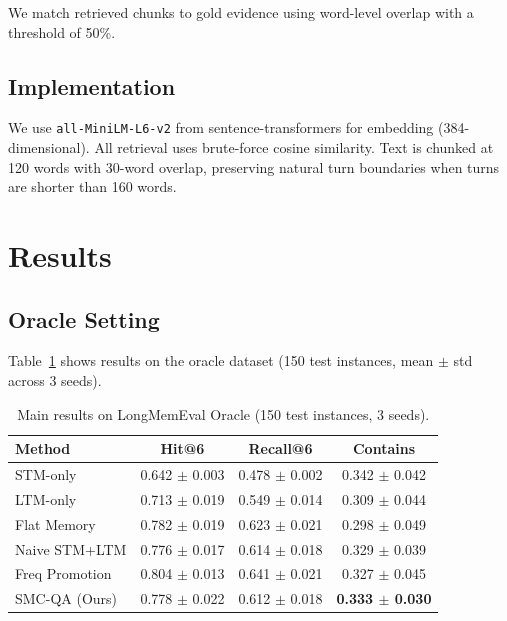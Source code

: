 \documentclass{article}
\begin{document}
We match retrieved chunks to gold evidence using word-level overlap with a threshold of 50\%.

\subsection{Implementation}

We use \texttt{all-MiniLM-L6-v2} from sentence-transformers for embedding (384-dimensional). All retrieval uses brute-force cosine similarity. Text is chunked at 120 words with 30-word overlap, preserving natural turn boundaries when turns are shorter than 160 words.

\section{Results}

\subsection{Oracle Setting}

Table~\ref{tab:main} shows results on the oracle dataset (150 test instances, mean $\pm$ std across 3 seeds).

\begin{table}[h]
\centering
\caption{Main results on LongMemEval Oracle (150 test instances, 3 seeds).}
\label{tab:main}
\begin{tabular}{lccc}
\toprule
\textbf{Method} & \textbf{Hit@6} & \textbf{Recall@6} & \textbf{Contains} \\
\midrule
STM-only & 0.642 $\pm$ 0.003 & 0.478 $\pm$ 0.002 & 0.342 $\pm$ 0.042 \\
LTM-only & 0.713 $\pm$ 0.019 & 0.549 $\pm$ 0.014 & 0.309 $\pm$ 0.044 \\
Flat Memory & 0.782 $\pm$ 0.019 & 0.623 $\pm$ 0.021 & 0.298 $\pm$ 0.049 \\
Naive STM+LTM & 0.776 $\pm$ 0.017 & 0.614 $\pm$ 0.018 & 0.329 $\pm$ 0.039 \\
Freq Promotion & 0.804 $\pm$ 0.013 & 0.641 $\pm$ 0.021 & 0.327 $\pm$ 0.045 \\
SMC-QA (Ours) & 0.778 $\pm$ 0.022 & 0.612 $\pm$ 0.018 & \textbf{0.333 $\pm$ 0.030} \\
\bottomrule
\end{tabular}
\end{table}
\end{document}
